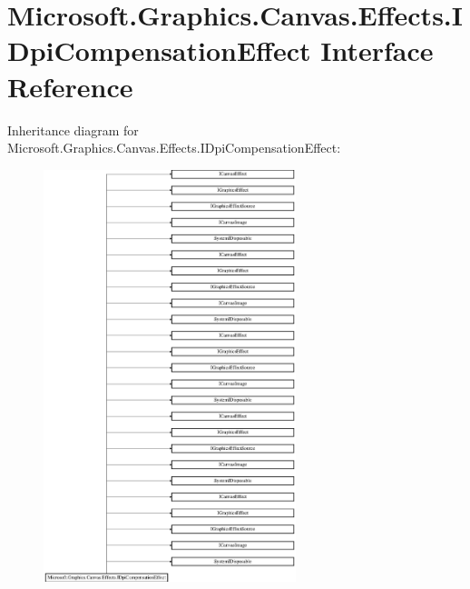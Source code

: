 \hypertarget{interface_microsoft_1_1_graphics_1_1_canvas_1_1_effects_1_1_i_dpi_compensation_effect}{}\section{Microsoft.\+Graphics.\+Canvas.\+Effects.\+I\+Dpi\+Compensation\+Effect Interface Reference}
\label{interface_microsoft_1_1_graphics_1_1_canvas_1_1_effects_1_1_i_dpi_compensation_effect}
Inheritance diagram for Microsoft.\+Graphics.\+Canvas.\+Effects.\+I\+Dpi\+Compensation\+Effect\+:\begin{figure}[H]
\begin{center}
\leavevmode
\includegraphics[height=12.000000cm]{interface_microsoft_1_1_graphics_1_1_canvas_1_1_effects_1_1_i_dpi_compensation_effect}
\end{center}
\end{figure}

